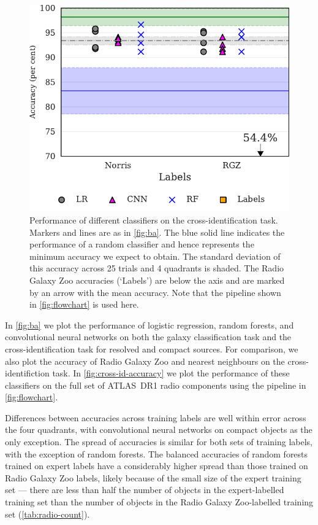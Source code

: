 \documentclass[fleqn,usenatbib,usedcolumn]{mnras}
\begin{document}
    \begin{figure}
      \centering
      \includegraphics[width=0.9\columnwidth]{images/cdfs_cross_identification_grid.pdf}
      \caption{Performance of different classifiers on the cross-identification task. Markers and lines are as in \autoref{fig:ba}. The blue solid line indicates the performance of a random classifier and hence represents the minimum accuracy we expect to obtain. The standard deviation of this accuracy across 25 trials and 4 quadrants is shaded. The Radio Galaxy Zoo accuracies (`Labels') are below the axis and are marked by an arrow with the mean accuracy. Note that the pipeline shown in \autoref{fig:flowchart} is used here.
        \label{fig:cross-id-accuracy}}
    \end{figure}

    In \autoref{fig:ba} we plot the performance of logistic regression, random
    forests, and convolutional neural networks on both the galaxy
    classification task and the cross-identification task for resolved and
    compact sources. For comparison, we also plot the accuracy of Radio Galaxy
    Zoo and nearest neighbours on the cross-identifiction task. In \autoref{fig:cross-id-accuracy} we plot the performance of these classifiers on the full set of ATLAS~DR1 radio components using the pipeline in \autoref{fig:flowchart}.

    Differences between accuracies across training
    labels are well within error across the four quadrants, with convolutional neural networks on compact objects as the only exception. The spread of
    accuracies is similar for both sets of training labels, with the exception
    of random forests. The balanced accuracies of random forests trained on expert labels have a considerably higher spread than those trained on Radio Galaxy Zoo labels, likely because of the small size of the expert training set --- there are less than half the number of objects in the expert-labelled training set than the number of objects in the Radio Galaxy Zoo-labelled training set (\autoref{tab:radio-count}).
\end{document}
